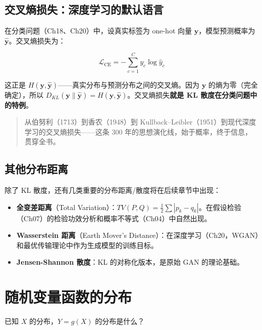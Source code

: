 \documentclass[
]{book}
\providecommand{\tightlist}{%
  \setlength{\itemsep}{0pt}\setlength{\parskip}{0pt}}
\begin{document}
\subsection{交叉熵损失：深度学习的默认语言}\label{ux4ea4ux53c9ux71b5ux635fux5931ux6df1ux5ea6ux5b66ux4e60ux7684ux9ed8ux8ba4ux8bedux8a00}

在分类问题（Ch18、Ch20）中，设真实标签为 one-hot 向量 \(\mathbf{y}\)，模型预测概率为 \(\hat{\mathbf{y}}\)。交叉熵损失为：

\[\mathcal{L}_{\text{CE}} = -\sum_{c=1}^C y_c \log \hat{y}_c\]

这正是 \(H(\mathbf{y}, \hat{\mathbf{y}})\)------真实分布与预测分布之间的交叉熵。因为 \(\mathbf{y}\) 的熵为零（完全确定），所以 \(D_{KL}(\mathbf{y} \parallel \hat{\mathbf{y}}) = H(\mathbf{y}, \hat{\mathbf{y}})\)。交叉熵损失\textbf{就是 KL 散度在分类问题中的特例}。

\begin{quote}
从伯努利（1713）到香农（1948）到 Kullback--Leibler（1951）到现代深度学习的交叉熵损失------这条 300 年的思想演化线，始于概率，终于信息，贯穿全书。
\end{quote}

\subsection{其他分布距离}\label{ux5176ux4ed6ux5206ux5e03ux8dddux79bb}

除了 KL 散度，还有几类重要的分布距离/散度将在后续章节中出现：

\begin{itemize}
\tightlist
\item
  \textbf{全变差距离}（Total Variation）：\(TV(P, Q) = \frac{1}{2}\sum |p_k - q_k|\)。在假设检验（Ch07）的检验功效分析和概率不等式（Ch04）中自然出现。
\item
  \textbf{Wasserstein 距离}（Earth Mover's Distance）：在深度学习（Ch20，WGAN）和最优传输理论中作为生成模型的训练目标。
\item
  \textbf{Jensen-Shannon 散度}：KL 的对称化版本，是原始 GAN 的理论基础。
\end{itemize}

\section{随机变量函数的分布}\label{ux968fux673aux53d8ux91cfux51fdux6570ux7684ux5206ux5e03}

已知 \(X\) 的分布，\(Y = g(X)\) 的分布是什么？
\end{document}
